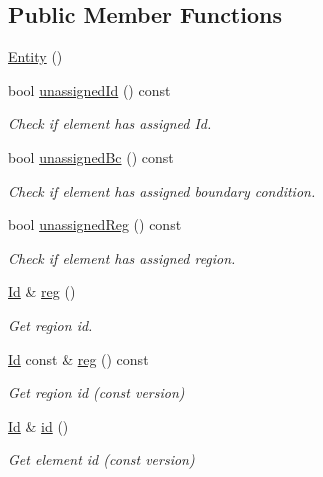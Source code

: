 \subsection*{Public Member Functions}
\begin{DoxyCompactItemize}
\item 
\hyperlink{classTspeed_1_1Entity_a2d38b43574ff32961cc54430d2641d9d}{Entity} ()
\item 
bool \hyperlink{classTspeed_1_1Entity_a0254af0831b2f3d9d2e225e8720f85b9}{unassigned\-Id} () const 
\begin{DoxyCompactList}\small\item\em Check if element has assigned Id. \end{DoxyCompactList}\item 
bool \hyperlink{classTspeed_1_1Entity_aea3dc95515ad3a025039de1963a33a06}{unassigned\-Bc} () const 
\begin{DoxyCompactList}\small\item\em Check if element has assigned boundary condition. \end{DoxyCompactList}\item 
bool \hyperlink{classTspeed_1_1Entity_ac1505ecd50daa5fcefe3bc6366977fc4}{unassigned\-Reg} () const 
\begin{DoxyCompactList}\small\item\em Check if element has assigned region. \end{DoxyCompactList}\item 
\hyperlink{classTspeed_1_1Entity_a32da920d1e9397a793b67beadd70e8fe}{Id} \& \hyperlink{classTspeed_1_1Entity_a783e9df1d967686bc39f26e43f7b6c3e}{reg} ()
\begin{DoxyCompactList}\small\item\em Get region id. \end{DoxyCompactList}\item 
\hyperlink{classTspeed_1_1Entity_a32da920d1e9397a793b67beadd70e8fe}{Id} const \& \hyperlink{classTspeed_1_1Entity_a69cb766f9523627435d0ff37e511253c}{reg} () const 
\begin{DoxyCompactList}\small\item\em Get region id (const version) \end{DoxyCompactList}\item 
\hyperlink{classTspeed_1_1Entity_a32da920d1e9397a793b67beadd70e8fe}{Id} \& \hyperlink{classTspeed_1_1Entity_abefec95d2d2511aa8ccc508a4472a339}{id} ()
\begin{DoxyCompactList}\small\item\em Get element id (const version) \end{DoxyCompactList}\item 

\end{DoxyCompactItemize}
